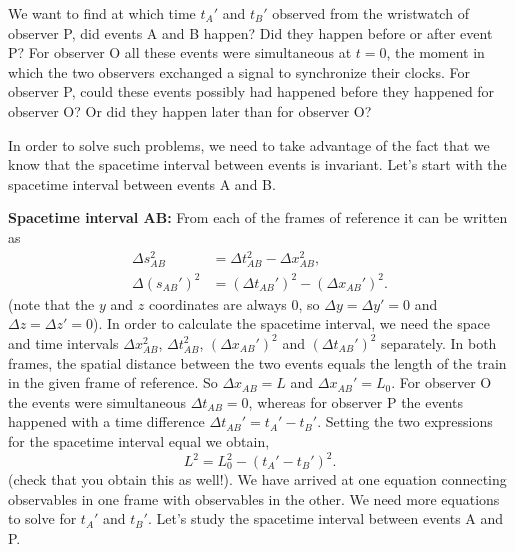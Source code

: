 {\begin{multicols}{2}
We want to find at which time $t_A'$ and $t_B'$ observed from the wristwatch of observer P, did events A and B happen? Did they happen before or after event P? For observer O all these events were simultaneous at $t=0$, the moment in which the two observers exchanged a signal to synchronize their clocks.  For observer P, could these events possibly had happened before they happened for observer O? Or did they happen later than for observer O?

In order to solve such problems, we need to take advantage of the fact that we know that the spacetime interval between events is invariant. Let's start with the spacetime interval between events A and B.

{\bf Spacetime interval AB:}
From each of the frames of reference it can be written as
\begin{align*}
\Delta s_{AB}^2&=\Delta t_{AB}^2-\Delta x_{AB}^2,\\
\Delta (s_{AB}')^2&=(\Delta t_{AB}')^2-(\Delta x_{AB}')^2.
\end{align*}
(note that the $y$ and $z$ coordinates are always 0, so $\Delta y=\Delta y'=0$ and $\Delta z=\Delta z'=0$). In order to calculate the spacetime interval, we need the space and time intervals $\Delta x_{AB}^2$, $\Delta t_{AB}^2$, $(\Delta x_{AB}')^2$ and $(\Delta t_{AB}')^2$ separately. In both frames, the spatial distance between the two events equals the length of the train in the given frame of reference. So $\Delta x_{AB}=L$ and $\Delta x_{AB}'=L_0$. For observer O the events were simultaneous $\Delta t_{AB}=0$, whereas for observer P the events happened with a time difference $\Delta t_{AB}'=t_A'-t_B'$. Setting the two expressions for the spacetime interval equal we obtain,
\begin{equation}
\label{eq:eq1}
L^2=L_0^2-(t_A'-t_B')^2.
\end{equation}
(check that you obtain this as well!). We have arrived at one equation connecting observables in one frame with observables in the other. We need more equations to solve for $t_A'$ and $t_B'$. Let's study the spacetime interval between events A and P.


\end{multicols}}
